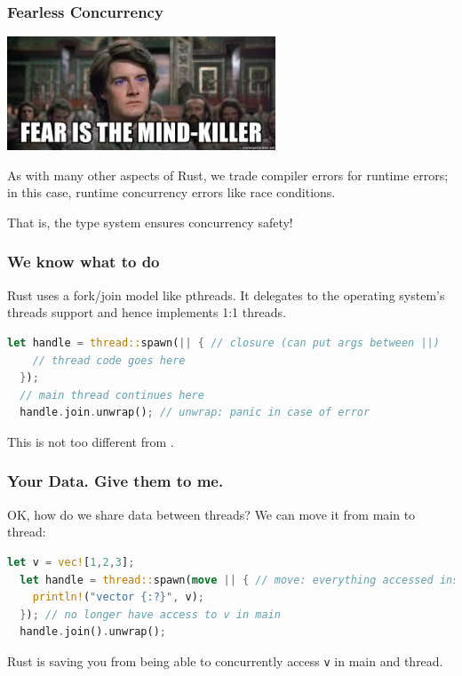 \begin{frame}
\frametitle{Fearless Concurrency}
\begin{center}
	\includegraphics[width=0.6\textwidth]{images/mindkiller.jpeg}
\end{center}

As with many other aspects of Rust, we trade compiler errors for runtime
errors; in this case, runtime concurrency errors like race conditions.


That is, the type system ensures concurrency safety!

\end{frame}


\begin{frame}[fragile]
\frametitle{We know what to do}

Rust uses a fork/join model like pthreads. It delegates to the operating
system's threads support and hence implements 1:1 threads.
\begin{lstlisting}[language=Rust]
  let handle = thread::spawn(|| { // closure (can put args between ||)
    // thread code goes here
  });
  // main thread continues here
  handle.join.unwrap(); // unwrap: panic in case of error
\end{lstlisting}
This is not too different from \CPP.


\end{frame}


\begin{frame}[fragile]
\frametitle{Your Data. Give them to me.}

OK, how do we share data between threads? We can move it from main to thread:
\begin{lstlisting}[language=Rust]
  let v = vec![1,2,3];
  let handle = thread::spawn(move || { // move: everything accessed inside closure is moved
    println!("vector {:?}", v);
  }); // no longer have access to v in main
  handle.join().unwrap();
\end{lstlisting}
Rust is saving you from being able to concurrently access {\tt v} in main and thread.


\end{frame}


